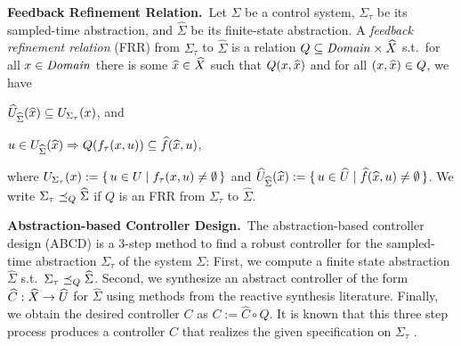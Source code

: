 %

\smallskip
\noindent\textbf{Feedback Refinement Relation.}\
Let $\Sigma$ be a control system, $\Sigma_\tau$ be its sampled-time abstraction, and $\widehat{\Sigma}$ be its finite-state abstraction.
A \emph{feedback refinement relation} (FRR) from $\Sigma_\tau$ to $\widehat{\Sigma}$ 
is a relation $Q\subseteq \mathit{Domain}\times \widehat{X}$ s.t.\ 
for all $x\in \mathit{Domain}$ there is some $\widehat{x}\in \widehat{X}$ such that $Q(x,\widehat{x})$ and
for all $(x,\widehat{x})\in Q$, we have
\begin{inparaenum}[(i)]
	\item $\widehat{U}_{\widehat{\Sigma}}(\widehat{x})\subseteq U_{\Sigma_\tau}(x)$, and 
	\item $u\in U_{\widehat{\Sigma}}(\widehat{x}) \Rightarrow Q(f_\tau(x,u))\subseteq \widehat{f}(\widehat{x},u)$,
\end{inparaenum}
where $U_{\Sigma_\tau}(x):=\set{u\in U \mid f_\tau(x,u)\neq \emptyset}$ and $\widehat{U}_{\widehat{\Sigma}}(\widehat{x}):=\set{u\in \widehat{U}\mid \widehat{f}(\widehat{x},u)\neq \emptyset}$.
We write $\Sigma_\tau \preceq_{Q} \widehat{\Sigma}$ if $Q$ is an FRR from $\Sigma_\tau$ to $\widehat{\Sigma}$.

\smallskip
\noindent\textbf{Abstraction-based Controller Design.}\
The abstraction-based controller design (ABCD) \cite{reissig2016feedback} is a $3$-step method to find a robust controller for the sampled-time abstraction $\Sigma_\tau$ of the system $\Sigma$:
First, we compute a finite state abstraction $\widehat{\Sigma}$ s.t.\ $\Sigma_\tau \preceq_{Q} \widehat{\Sigma}$.
Second, we synthesize an abstract controller of the form $\widehat{C}:\widehat{X}\rightarrow \widehat{U}$ for $\widehat{\Sigma}$ using methods from the reactive synthesis literature.
Finally, we obtain the desired controller $C$ as $C:=\widehat{C}\circ Q$.
It is known that this three step process produces a controller $C$ that realizes the given specification on $\Sigma_\tau$ \cite{reissig2016feedback}.

